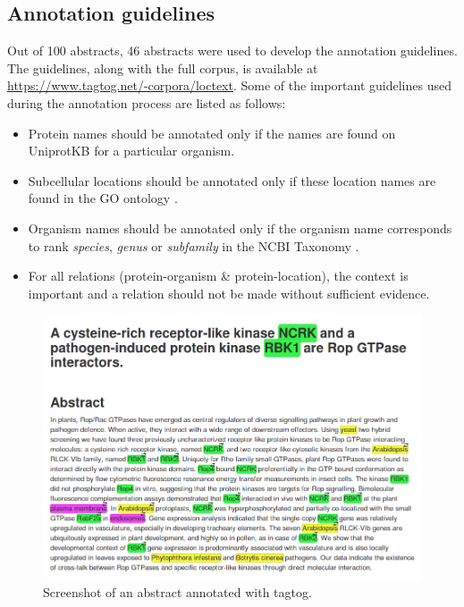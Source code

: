 \subsection*{Annotation guidelines}

Out of 100 abstracts, 46 abstracts were used to develop the annotation guidelines. The guidelines, along with the full corpus, is available at \url{https://www.tagtog.net/-corpora/loctext}. Some of the important guidelines used during the annotation process are listed as follows:

\begin{itemize}

\item Protein names should be annotated only if the names are found on UniprotKB \cite{magrane2011uniprot} for a particular organism.

\item Subcellular locations should be annotated only if these location names are found in the GO ontology \cite{ashburner2000gene}.

\item Organism names should be annotated only if the organism name corresponds to rank \textit{species}, \textit{genus} or \textit{subfamily} in the NCBI Taxonomy \cite{ncbiTaxonomy}.

\item For all relations (protein-organism \& protein-location), the context is important and a relation should not be made without sufficient evidence.

\end{itemize}


\begin{figure}
\centering
\includegraphics[scale=0.4]{figures/tagtog_screenshot.png}
\caption{Screenshot of an abstract annotated with tagtog.}\label{fig:tagtogScreenshot}
\end{figure}

